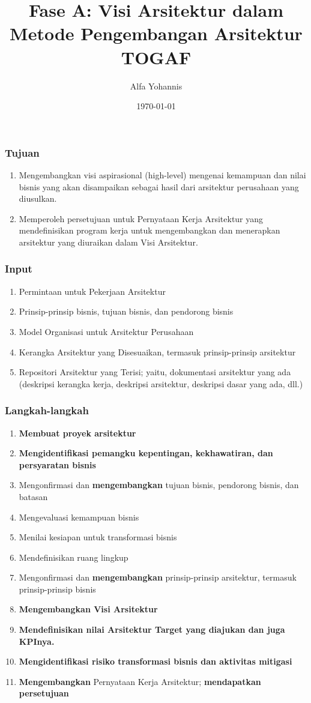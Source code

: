 \documentclass[aspectratio=169]{beamer}
\title{Fase A: Visi Arsitektur dalam Metode Pengembangan Arsitektur TOGAF}
\author{Alfa Yohannis}
\date{\today}
\begin{document}
	
	\frame{\titlepage}
	
	\begin{frame}
		\frametitle{Tujuan}
		\begin{enumerate}			
			\item Mengembangkan visi aspirasional (high-level) mengenai kemampuan dan nilai bisnis yang akan disampaikan sebagai hasil dari arsitektur perusahaan yang diusulkan.
			\item Memperoleh persetujuan untuk Pernyataan Kerja Arsitektur yang mendefinisikan program kerja untuk mengembangkan dan menerapkan arsitektur yang diuraikan dalam Visi Arsitektur.
		\end{enumerate}
	\end{frame}
	
	\begin{frame}
		\frametitle{Input}
		\begin{enumerate}
			\item Permintaan untuk Pekerjaan Arsitektur
			\item Prinsip-prinsip bisnis, tujuan bisnis, dan pendorong bisnis
			\item Model Organisasi untuk Arsitektur Perusahaan
			\item Kerangka Arsitektur yang Disesuaikan, termasuk prinsip-prinsip arsitektur
			\item Repositori Arsitektur yang Terisi; yaitu, dokumentasi arsitektur yang ada (deskripsi kerangka kerja, deskripsi arsitektur, deskripsi dasar yang ada, dll.)
		\end{enumerate}
	\end{frame}
	
	\begin{frame}
		\frametitle{Langkah-langkah}
		\begin{enumerate}
			\item \textbf{Membuat proyek arsitektur}
			\item \textbf{Mengidentifikasi pemangku kepentingan, kekhawatiran, dan persyaratan bisnis}
			\item Mengonfirmasi dan \textbf{mengembangkan} tujuan bisnis, pendorong bisnis, dan batasan
			\item Mengevaluasi kemampuan bisnis
			\item Menilai kesiapan untuk transformasi bisnis
			\item Mendefinisikan ruang lingkup
			\item Mengonfirmasi dan \textbf{mengembangkan} prinsip-prinsip arsitektur, termasuk prinsip-prinsip bisnis
			\item \textbf{Mengembangkan Visi Arsitektur}
			\item \textbf{Mendefinisikan nilai Arsitektur Target yang diajukan dan juga KPInya.} 
			\item \textbf{Mengidentifikasi risiko transformasi bisnis dan aktivitas mitigasi}
			\item \textbf{Mengembangkan} Pernyataan Kerja Arsitektur; \textbf{mendapatkan persetujuan}
		\end{enumerate}
	\end{frame}
	
\end{document}
